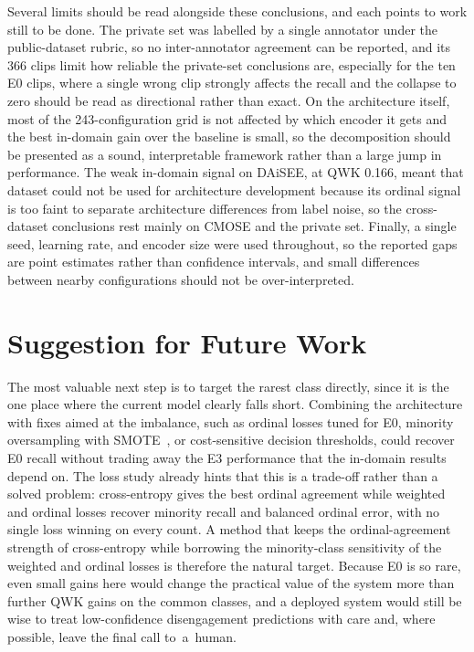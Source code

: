 \documentclass[../main.tex]{subfiles}
\begin{document}
Several limits should be read alongside these conclusions, and each points to work still to be done. The private set was labelled by a single annotator under the public-dataset rubric, so no inter-annotator agreement can be reported, and its 366 clips limit how reliable the private-set conclusions are, especially for the ten E0 clips, where a single wrong clip strongly affects the recall and the collapse to zero should be read as directional rather than exact. On the architecture itself, most of the 243-configuration grid is not affected by which encoder it gets and the best in-domain gain over the baseline is small, so the decomposition should be presented as a sound, interpretable framework rather than a large jump in performance. The weak in-domain signal on DAiSEE, at QWK 0.166, meant that dataset could not be used for architecture development because its ordinal signal is too faint to separate architecture differences from label noise, so the cross-dataset conclusions rest mainly on CMOSE and the private set. Finally, a single seed, learning rate, and encoder size were used throughout, so the reported gaps are point estimates rather than confidence intervals, and small differences between nearby configurations should not be over-interpreted.

\FloatBarrier
\section{Suggestion for Future Work}
\label{sec:future}

The most valuable next step is to target the rarest class directly, since it is the one place where the current model clearly falls short. Combining the architecture with fixes aimed at the imbalance, such as ordinal losses tuned for E0, minority oversampling with SMOTE~\cite{smote}, or cost-sensitive decision thresholds, could recover E0 recall without trading away the E3 performance that the in-domain results depend on. The loss study already hints that this is a trade-off rather than a solved problem: cross-entropy gives the best ordinal agreement while weighted and ordinal losses recover minority recall and balanced ordinal error, with no single loss winning on every count. A method that keeps the ordinal-agreement strength of cross-entropy while borrowing the minority-class sensitivity of the weighted and ordinal losses is therefore the natural target. Because E0 is so rare, even small gains here would change the practical value of the system more than further QWK gains on the common classes, and a deployed system would still be wise to treat low-confidence disengagement predictions with care and, where possible, leave the final call to~a~human.
\end{document}
